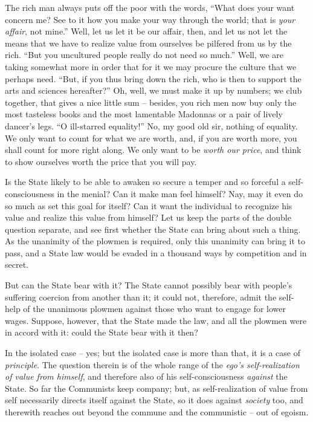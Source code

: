 \documentclass[12pt,a4paper]{book}
\begin{document}
The rich man always puts off the poor with the words, ``What does your want 
concern me? See to it how you make your way through the world; that is 
\textit{your affair}, not mine.'' Well, let us let it be our affair, then, 
and let us not let the means that we have to realize value from ourselves be 
pilfered from us by the rich. ``But you uncultured people really do not need 
so much.'' Well, we are taking somewhat more in order that for it we may 
procure the culture that we perhaps need. ``But, if you thus bring down the 
rich, who is then to support the arts and sciences hereafter?'' Oh, well, we 
must make it up by numbers; we club together, that gives a nice little sum -- 
besides, you rich men now buy only the most tasteless books and the most 
lamentable Madonnas or a pair of lively dancer's legs. ``O ill-starred 
equality!'' No, my good old sir, nothing of equality. We only want to count 
for what we are worth, and, if you are worth more, you shall count for more 
right along. We only want to be \textit{worth our price}, and think to show 
ourselves worth the price that you will pay.

Is the State likely to be able to awaken so secure a temper and so forceful a 
self-consciousness in the menial? Can it make man feel himself? Nay, may it 
even do so much as set this goal for itself? Can it want the individual to 
recognize his value and realize this value from himself? Let us keep the parts 
of the double question separate, and see first whether the State can bring 
about such a thing. As the unanimity of the plowmen is required, only this 
unanimity can bring it to pass, and a State law would be evaded in a thousand 
ways by competition and in secret.

But can the State bear with it? The State cannot possibly bear with people's 
suffering coercion from another than it; it could not, therefore, admit the 
self-help of the unanimous plowmen against those who want to engage for lower 
wages. Suppose, however, that the State made the law, and all the plowmen were 
in accord with it: could the State bear with it then?

In the isolated case -- yes; but the isolated case is more than that, it is a 
case of \textit{principle}. The question therein is of the whole range of the 
\textit{ego's self-realization of value from himself}, and therefore also of 
his self-consciousness \textit{against} the State. So far the Communists keep 
company; but, as self-realization of value from self necessarily directs 
itself against the State, so it does against \textit{society} too, and 
therewith reaches out beyond the commune and the communistic -- out of egoism.
\end{document}
